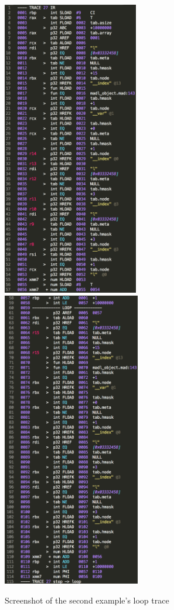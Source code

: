 \begin{figure}[H]
    \centering
    \includegraphics[height=13cm]{./Images/trace-2a}
    \includegraphics[height=13cm]{./Images/trace-2b}
    \caption{Screenshot of the second example's loop trace}
    \label{fig:MO-ex-dump2}
\end{figure}
